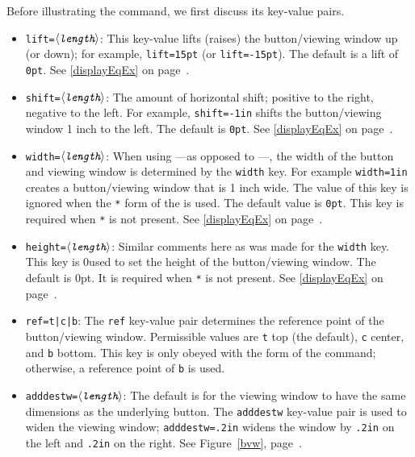 \documentclass{article}
\def\meta#1{$\langle\textit{\texttt{#1}}\rangle$}
\begin{document}
Before illustrating the  command, we first discuss its
key-value pairs.
\begin{itemize}
\item \texttt{lift=\meta{length}}: This key-value lifts (raises) the
    button/viewing window up (or down); for example,
    \texttt{lift=15pt} (or \texttt{lift=-15pt}). The default is a lift
    of \texttt{0pt}. See \autoref{displayEqEx} on page~\pageref*{displayEqEx}.

\item \texttt{shift=\meta{length}}: The amount of horizontal shift;
    positive to the right, negative to the left. For example,
    \texttt{shift=-1in} shifts the button/viewing window 1 inch to the
    left. The default is \texttt{0pt}. See
    \autoref{displayEqEx} on page~\pageref*{displayEqEx}.

\item \texttt{width=\meta{length}}: When using ---as
    opposed to ---, the width of the button and viewing
    window is determined by the \texttt{width} key. For example
    \texttt{width=1in} creates a button/viewing window that is 1 inch
    wide. The value of this key is ignored when the \texttt{*} form of
    the  is used. The default value is \texttt{0pt}. This
    key is required when \texttt{*} is not present. See
    \autoref{displayEqEx} on page~\pageref*{displayEqEx}.

\item \texttt{height=\meta{length}}: Similar comments here as was made
    for the \texttt{width} key. This key is 0used to set the height of
    the button/viewing window. The default is 0pt. It is required when
    \texttt{*} is not present. See \autoref{displayEqEx} on
    page~\pageref*{displayEqEx}.

\item \texttt{ref=t|c|b}: The \texttt{ref} key-value pair determines
    the reference point of the button/viewing window. Permissible
    values are \texttt{t} top (the default), \texttt{c} center, and
    \texttt{b} bottom. This key is only obeyed with the 
    form of the command; otherwise, a reference point of \texttt{b} is
    used.

\item \texttt{adddestw=\meta{length}}: The default is for the viewing window to have
the same dimensions as the underlying button. The \texttt{adddestw}
key-value pair is used to widen the viewing window; \texttt{adddestw=.2in}
widens the window by \texttt{.2in} on the left and \texttt{.2in} on the
right. See Figure~\ref*{bvw}, page~\pageref*{bvw}.


\end{itemize}
\end{document}

